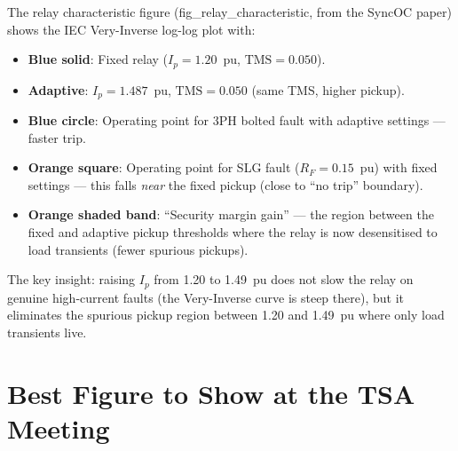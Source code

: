 \documentclass[12pt,a4paper]{article}
\newcommand{\TMS}{\mathrm{TMS}}
\begin{document}
The relay characteristic figure (fig\_relay\_characteristic, from the SyncOC paper) shows the IEC Very-Inverse log-log plot with:
\begin{itemize}[nosep]
  \item \textbf{Blue solid}: Fixed relay ($I_p = 1.20$~pu, $\TMS = 0.050$).
  \item \textbf{Adaptive}: $I_p = 1.487$~pu, $\TMS = 0.050$ (same TMS, higher pickup).
  \item \textbf{Blue circle}: Operating point for 3PH bolted fault with adaptive settings --- faster trip.
  \item \textbf{Orange square}: Operating point for SLG fault ($R_F = 0.15$~pu) with fixed settings --- this falls \emph{near} the fixed pickup (close to ``no trip'' boundary).
  \item \textbf{Orange shaded band}: ``Security margin gain'' --- the region between the fixed and adaptive pickup thresholds where the relay is now desensitised to load transients (fewer spurious pickups).
\end{itemize}

The key insight: raising $I_p$ from 1.20 to 1.49~pu does not slow the relay on genuine high-current faults (the Very-Inverse curve is steep there), but it eliminates the spurious pickup region between 1.20 and 1.49~pu where only load transients live.

\section{Best Figure to Show at the TSA Meeting}
\end{document}
